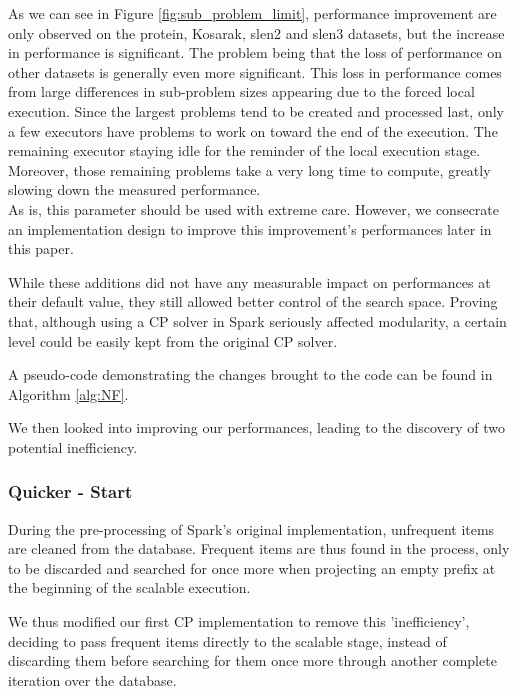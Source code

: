 \documentclass{eplmastersthesis}
\begin{document}
\begin{enumerate}
	 As we can see in Figure \ref{fig:sub_problem_limit}, performance improvement are only observed on the protein, Kosarak, slen2 and slen3 datasets, but the increase in performance is significant. The problem being that the loss of performance on other datasets is generally even more significant. This loss in performance comes from large differences in sub-problem sizes appearing due to the forced local execution. Since the largest problems tend to be created and processed last, only a few executors have problems to work on toward the end of the execution. The remaining executor staying idle for the reminder of the local execution stage. Moreover, those remaining problems take a very long time to compute, greatly slowing down the measured performance. \\
	 As is, this parameter should be used with extreme care. However, we consecrate an implementation design to improve this improvement's performances later in this paper.
\end{enumerate}

While these additions did not have any measurable impact on performances at their default value, they still allowed better control of the search space. Proving that, although using a CP solver in Spark seriously affected modularity, a certain level could be easily kept from the original CP solver. \newline

A pseudo-code demonstrating the changes brought to the code can be found in Algorithm \ref{alg:NF}. \newline

We then looked into improving our performances, leading to the discovery of two potential inefficiency.

\subsubsection{Quicker - Start}

During the pre-processing of Spark's original implementation, unfrequent items are cleaned from the database. Frequent items are thus found in the process, only to be discarded and searched for once more when projecting an empty prefix at the beginning of the scalable execution. \newline

We thus modified our first CP implementation to remove this 'inefficiency', deciding to pass frequent items directly to the scalable stage, instead of discarding them before searching for them once more through another complete iteration over the database. \newline
\end{document}

